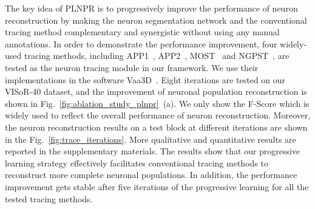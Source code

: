The key idea of PLNPR is to progressively improve the performance of neuron reconstruction by making the neuron segmentation network and the conventional tracing method complementary and synergistic without using any manual annotations.
In order to demonstrate the performance improvement, four widely-used tracing methods, including APP1~\cite{Peng2011}, APP2~\cite{Xiao2013}, MOST~\cite{Wu2014} and NGPST~\cite{Quan2015}, are tested as the neuron tracing module in our framework. 
We use their implementations in the software Vaa3D~\cite{Peng2014}. 
%
Eight iterations are tested on our VISoR-40 dataset, and the improvement of neuronal population reconstruction is shown in Fig.~\ref{fig:ablation_study_plnpr}~(a).
We only show the F-Score which is widely used to reflect the overall performance of neuron reconstruction.
%
Moreover, the neuron reconstruction results on a test block at different iterations are shown in the Fig.~\ref{fig:trace_iterations}.
%
More qualitative and quantitative results are reported in the supplementary materials.
The results show that our progressive learning strategy effectively facilitates conventional tracing methods to reconstruct more complete neuronal populations.
In addition, the performance improvement gets stable after five iterations of the progressive learning for all the tested tracing methods. 

